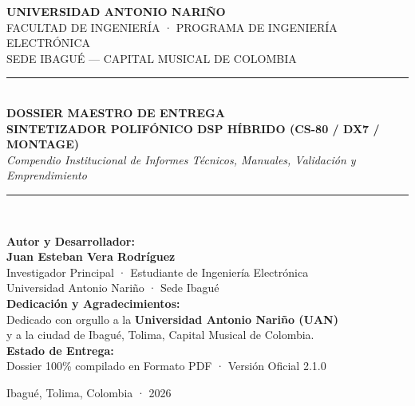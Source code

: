 \documentclass[11pt,a4paper]{article}
\begin{document}
\begin{titlepage}
    \centering
    \vspace*{0.5cm}
    
    {\scshape\LARGE \textbf{UNIVERSIDAD ANTONIO NARIÑO}}\\[0.3cm]
    {\scshape\large FACULTAD DE INGENIERÍA · PROGRAMA DE INGENIERÍA ELECTRÓNICA}\\[0.15cm]
    {\small SEDE IBAGUÉ — CAPITAL MUSICAL DE COLOMBIA}\\[1.5cm]
    
    \rule{\linewidth}{1.8pt}\\[0.4cm]
    {\Huge \bfseries \textcolor{uanblue}{DOSSIER MAESTRO DE ENTREGA}}\\[0.35cm]
    {\Large \bfseries SINTETIZADOR POLIFÓNICO DSP HÍBRIDO (CS-80 / DX7 / MONTAGE)}\\[0.25cm]
    {\large \itshape Compendio Institucional de Informes Técnicos, Manuales, Validación y Emprendimiento}\\[0.4cm]
    \rule{\linewidth}{1.8pt}\\[2.0cm]
    
    \begin{minipage}{0.85\textwidth}
        \large
        \textbf{Autor y Desarrollador:}\\[0.15cm]
        \textbf{Juan Esteban Vera Rodríguez}\\
        Investigador Principal · Estudiante de Ingeniería Electrónica\\
        Universidad Antonio Nariño · Sede Ibagué\\[0.8cm]
        
        \textbf{Dedicación y Agradecimientos:}\\
        Dedicado con orgullo a la \textbf{Universidad Antonio Nariño (UAN)}\\
        y a la ciudad de Ibagué, Tolima, Capital Musical de Colombia.\\[0.8cm]
        
        \textbf{Estado de Entrega:}\\
        Dossier 100\% compilado en Formato PDF · Versión Oficial 2.1.0
    \end{minipage}
    
    \vfill
    {\large Ibagué, Tolima, Colombia · 2026}
\end{titlepage}
\end{document}
